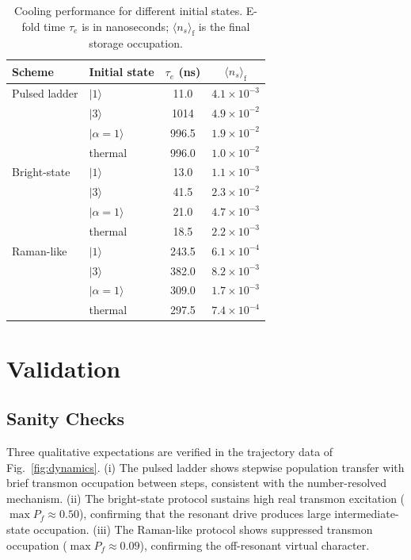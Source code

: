 \documentclass[aps,pra,twocolumn,reprint,floatfix,amsmath,amssymb]{revtex4-2}
\begin{document}
\begin{table}[t]
\caption{Cooling performance for different initial states. E-fold time $\tau_e$ is in nanoseconds; $\langle n_s\rangle_{\mathrm{f}}$ is the final storage occupation.}
\label{tab:initial_states}
\begin{tabular}{llcc}
\toprule
Scheme & Initial state & $\tau_e$ (ns) & $\langle n_s\rangle_{\mathrm{f}}$ \\
\midrule
Pulsed ladder   & $|1\rangle$ & 11.0   & $4.1 \times 10^{-3}$ \\
                & $|3\rangle$ & 1014   & $4.9 \times 10^{-2}$ \\
                & $|\alpha{=}1\rangle$ & 996.5  & $1.9 \times 10^{-2}$ \\
                & thermal     & 996.0  & $1.0 \times 10^{-2}$ \\
\midrule
Bright-state    & $|1\rangle$ & 13.0   & $1.1 \times 10^{-3}$ \\
                & $|3\rangle$ & 41.5   & $2.3 \times 10^{-2}$ \\
                & $|\alpha{=}1\rangle$ & 21.0   & $4.7 \times 10^{-3}$ \\
                & thermal     & 18.5   & $2.2 \times 10^{-3}$ \\
\midrule
Raman-like      & $|1\rangle$ & 243.5  & $6.1 \times 10^{-4}$ \\
                & $|3\rangle$ & 382.0  & $8.2 \times 10^{-3}$ \\
                & $|\alpha{=}1\rangle$ & 309.0  & $1.7 \times 10^{-3}$ \\
                & thermal     & 297.5  & $7.4 \times 10^{-4}$ \\
\bottomrule
\end{tabular}
\end{table}

\section{Validation}
\label{sec:validation}

\subsection{Sanity Checks}

Three qualitative expectations are verified in the trajectory data of Fig.~\ref{fig:dynamics}.
(i) The pulsed ladder shows stepwise population transfer with brief transmon occupation between steps, consistent with the number-resolved mechanism.
(ii) The bright-state protocol sustains high real transmon excitation ($\max P_f \approx 0.50$), confirming that the resonant drive produces large intermediate-state occupation.
(iii) The Raman-like protocol shows suppressed transmon occupation ($\max P_f \approx 0.09$), confirming the off-resonant virtual character.
\end{document}
